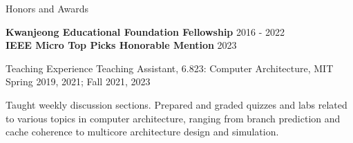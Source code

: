 \documentclass{resume} %
\begin{document}

\begin{rSection}{Honors and Awards}

{\bf Kwanjeong Educational Foundation Fellowship} \hfill {2016 - 2022} \\
\textbf{IEEE Micro Top Picks Honorable Mention} \hfill {2023}

\end{rSection}


\begin{rSection}{Teaching Experience}
Teaching Assistant, 6.823: Computer Architecture, MIT \hfill {Spring 2019, 2021; Fall 2021, 2023}
\item Taught weekly discussion sections. Prepared and graded quizzes and labs related to 
    various topics in computer architecture, ranging from branch prediction and cache coherence
    to multicore architecture design and simulation.

\end{rSection}








\end{document}

